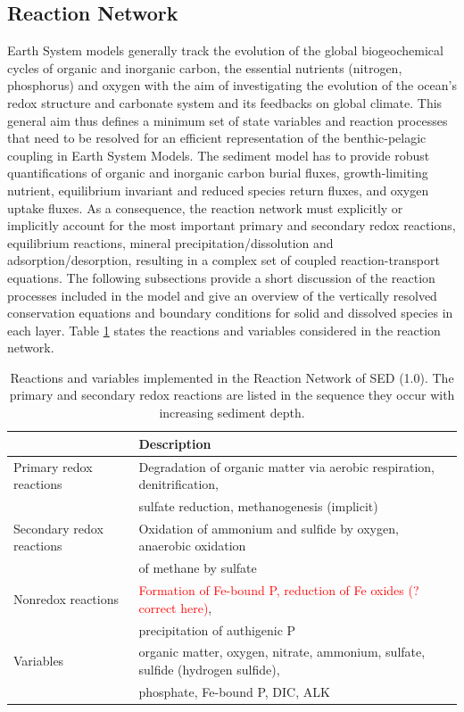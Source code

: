 \documentclass[gmd, manuscript]{copernicus}
\begin{document}
\subsection{Reaction Network}\label{subsec:ReactionNetwork}
Earth System models generally track the evolution of the global biogeochemical cycles of organic and inorganic carbon, the essential nutrients (nitrogen, phosphorus) and oxygen with the aim of investigating the evolution 
of the ocean's redox structure and carbonate system and its feedbacks on global climate. This general aim thus defines a minimum set of state variables and reaction processes that need to be resolved for an efficient 
representation of the benthic-pelagic coupling in Earth System Models. The sediment model has to provide robust quantifications of organic and inorganic carbon burial fluxes, growth-limiting nutrient, equilibrium invariant 
and reduced species return fluxes, and oxygen uptake fluxes. As a consequence, the reaction network must explicitly or implicitly account for the most important primary and secondary redox reactions, equilibrium reactions, 
mineral precipitation/dissolution and adsorption/desorption, resulting in a complex set of coupled reaction-transport equations. The following 
subsections provide a short discussion of the reaction processes included in the model and give an overview of the 
vertically resolved conservation equations and boundary conditions for solid and dissolved species in each layer. Table \ref{table:reactions_processes} states the reactions and variables considered in the reaction network. 
\begin{table}[tbp]
\caption{Reactions and variables implemented in the Reaction Network of SED (1.0). The primary and secondary redox reactions are listed in the sequence they occur with increasing sediment depth.}
\centering
\begin{tabular}{l l}
\hline\hline
 & Description\\
\hline
Primary redox reactions &  Degradation of organic matter via aerobic respiration, denitrification,\\
& sulfate reduction, methanogenesis (implicit)\\
Secondary redox reactions &  Oxidation of ammonium and sulfide by oxygen, anaerobic oxidation\\
& of methane by sulfate\\
Nonredox reactions & \textcolor{red}{Formation of Fe-bound P, reduction of Fe oxides (?correct here)},\\
& precipitation of authigenic P \\
Variables & organic matter, oxygen, nitrate, ammonium, sulfate, sulfide (hydrogen sulfide),\\
&  phosphate, Fe-bound P, DIC, ALK\\
\hline\hline
\end{tabular}
\label{table:reactions_processes}
\end{table}
\end{document}
